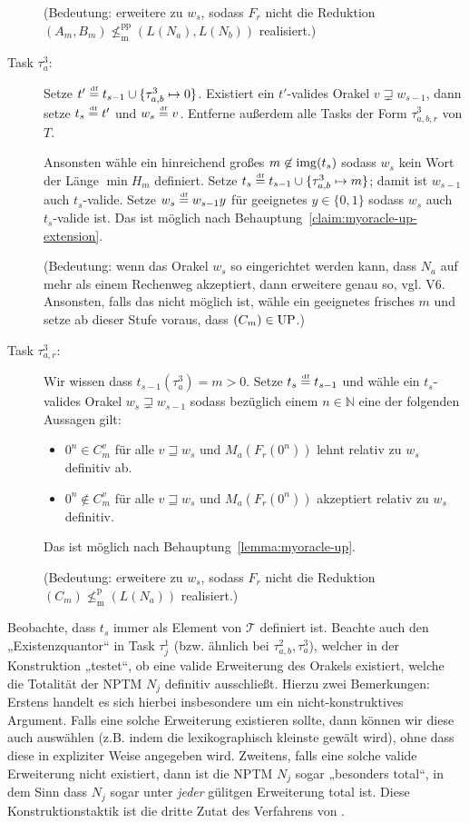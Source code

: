 \begin{description}
        (Bedeutung: erweitere zu $w_s$, sodass $F_r$ nicht die Reduktion $(A_m, B_m)\not\leq_\mathrm{m}^\mathrm{pp} (L(N_a), L(N_b))$ realisiert.) 

    \item[Task $\tau^3_{a}$:] Setze $t'\stackrel{\text{\smash{\tiny df}}}{=} t_{s-1}\cup\{\tau^3_{a,b}\mapsto 0\}$. Existiert ein $t'$-valides Orakel $v\sqsupsetneq w_{s-1}$, dann setze $t_s\stackrel{\text{\smash{\tiny df}}}{=} t'$ und $w_s\stackrel{\text{\smash{\tiny df}}}{=} v$. Entferne außerdem alle Tasks der Form $\tau^3_{a,b,r}$ von $T$.

        Ansonsten wähle ein hinreichend großes $m\not\in \operatorname{img}(t_s)$ sodass $w_s$ kein Wort der Länge $\min H_m$ definiert. Setze $t_s\stackrel{\text{\smash{\tiny df}}}{=} t_{s-1}\cup \{ \tau^3_{a,b}\mapsto m \}$; damit ist $w_{s-1}$ auch $t_s$-valide. Setze $w_s\stackrel{\text{\smash{\tiny df}}}{=} w_{s-1}y$ für geeignetes $y\in\{0,1\}$ sodass $w_s$ auch $t_s$-valide ist. Das ist möglich nach Behauptung~\ref{claim:myoracle-up-extension}.

        (Bedeutung: wenn das Orakel $w_s$ so eingerichtet werden kann, dass $N_a$ auf mehr als einem Rechenweg akzeptiert, dann erweitere genau so, vgl. V6. Ansonsten, falls das nicht möglich ist, wähle ein geeignetes frisches $m$ und setze ab dieser Stufe voraus, dass $(C_m)\in \mathrm{UP}$.) 

    \item[Task $\tau^3_{a,r}$:] Wir wissen dass $t_{s-1}(\tau^3_{a})=m>0$. Setze $t_s\stackrel{\text{\smash{\tiny df}}}{=} t_{s-1}$ und wähle ein $t_s$-valides Orakel $w_s\sqsupsetneq w_{s-1}$ sodass bezüglich einem $n\in\mathbb N$ eine der folgenden Aussagen gilt:
        \begin{itemize}[nosep,endpenalty=10000]
            \item $0^n\in C_m^v$ für alle $v\sqsupseteq w_s$ und $M_a(F_r(0^n))$ lehnt relativ zu $w_s$ definitiv ab.
            \item $0^n\not\in C_m^v$ für alle $v\sqsupseteq w_s$ und $M_a(F_r(0^n))$ akzeptiert relativ zu $w_s$ definitiv.
        \end{itemize} Das ist möglich nach Behauptung~\ref{lemma:myoracle-up}.

        (Bedeutung: erweitere zu $w_s$, sodass $F_r$ nicht die Reduktion $(C_m)\not\leq_\mathrm{m}^\mathrm{p} (L(N_a))$ realisiert.) 
\end{description}

Beobachte, dass $t_s$ immer als Element von $\mathcal T$ definiert ist.
Beachte auch den „Existenzquantor“ in Task $\tau^1_j$ (bzw. ähnlich bei $\tau^2_{a,b}, \tau^3_a$), welcher in der Konstruktion „testet“, ob eine valide Erweiterung des Orakels existiert, welche die Totalität der NPTM $N_j$ definitiv ausschließt. 
Hierzu zwei Bemerkungen: Erstens handelt es sich hierbei insbesondere um ein nicht-konstruktives Argument. Falls eine solche Erweiterung existieren sollte, dann können wir diese auch auswählen (z.B. indem die lexikographisch kleinste gewält wird), ohne dass diese in expliziter Weise angegeben wird.
Zweitens, falls eine solche valide Erweiterung nicht existiert, dann ist die NPTM $N_j$ sogar „besonders total“, in dem Sinn dass $N_j$ sogar unter \emph{jeder} gülitgen Erweiterung total ist. 
Diese Konstruktionstaktik ist die dritte Zutat des Verfahrens von \citeauthor{dose_np-completeness_2019}.

